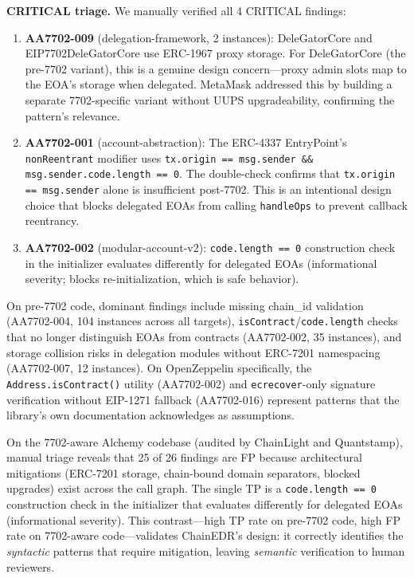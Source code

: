 \textbf{CRITICAL triage.} We manually verified all 4 CRITICAL findings:

\begin{enumerate}
    \item \textbf{AA7702-009} (delegation-framework, 2 instances): DeleGatorCore and EIP7702DeleGatorCore use ERC-1967 proxy storage. For DeleGatorCore (the pre-7702 variant), this is a genuine design concern---proxy admin slots map to the EOA's storage when delegated. MetaMask addressed this by building a separate 7702-specific variant without UUPS upgradeability, confirming the pattern's relevance.
    \item \textbf{AA7702-001} (account-abstraction): The ERC-4337 EntryPoint's \texttt{nonReentrant} modifier uses \texttt{tx.origin == msg.sender \&\& msg.sender.code.length == 0}. The double-check confirms that \texttt{tx.origin == msg.sender} alone is insufficient post-7702. This is an intentional design choice that blocks delegated EOAs from calling \texttt{handleOps} to prevent callback reentrancy.
    \item \textbf{AA7702-002} (modular-account-v2): \texttt{code.length == 0} construction check in the initializer evaluates differently for delegated EOAs (informational severity; blocks re-initialization, which is safe behavior).
\end{enumerate}

On pre-7702 code, dominant findings include missing chain\_id validation (AA7702-004, 104 instances across all targets), \texttt{isContract}/\texttt{code.length} checks that no longer distinguish EOAs from contracts (AA7702-002, 35 instances), and storage collision risks in delegation modules without ERC-7201 namespacing (AA7702-007, 12 instances). On OpenZeppelin specifically, the \texttt{Address.isContract()} utility (AA7702-002) and \texttt{ecrecover}-only signature verification without EIP-1271 fallback (AA7702-016) represent patterns that the library's own documentation acknowledges as assumptions.

On the 7702-aware Alchemy codebase (audited by ChainLight and Quantstamp), manual triage reveals that 25 of 26 findings are FP because architectural mitigations (ERC-7201 storage, chain-bound domain separators, blocked upgrades) exist across the call graph. The single TP is a \texttt{code.length == 0} construction check in the initializer that evaluates differently for delegated EOAs (informational severity). This contrast---high TP rate on pre-7702 code, high FP rate on 7702-aware code---validates ChainEDR's design: it correctly identifies the \textit{syntactic} patterns that require mitigation, leaving \textit{semantic} verification to human reviewers.
